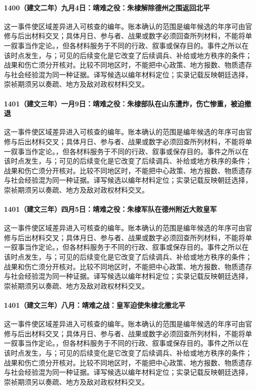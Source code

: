 \paragraph{1400（建文二年）九月4日：靖难之役：朱棣解除德州之围返回北平} 这一事件使区域差异进入可核查的编年。账本确认的范围是编年候选的年序可由官修与后出材料交叉；具体月日、参与者、战果或数字必须回查所列材料，不能将单一叙事当作定论。，但各材料服务于不同的行政、叙事或保存目的。事件之所以在该时点发生，与；可见的后续变化是它改变了后续调兵、补给或地方秩序的条件；战果和伤亡须分开核对。比较不同地区时，不能把中心政策、地方报数、物质遗存与社会经验混为同一种证据。译写候选以编年材料定位；实录记载反映朝廷选择，崇祯期须另以奏疏、地方及敌对政权材料交叉。

\paragraph{1401（建文三年）一月9日：靖难之役：朱棣部队在山东遭炸，伤亡惨重，被迫撤退} 这一事件使区域差异进入可核查的编年。账本确认的范围是编年候选的年序可由官修与后出材料交叉；具体月日、参与者、战果或数字必须回查所列材料，不能将单一叙事当作定论。，但各材料服务于不同的行政、叙事或保存目的。事件之所以在该时点发生，与；可见的后续变化是它改变了后续调兵、补给或地方秩序的条件；战果和伤亡须分开核对。比较不同地区时，不能把中心政策、地方报数、物质遗存与社会经验混为同一种证据。译写候选以编年材料定位；实录记载反映朝廷选择，崇祯期须另以奏疏、地方及敌对政权材料交叉。

\paragraph{1401（建文三年）四月5日：靖难之役：朱棣军队在德州附近大败皇军} 这一事件使区域差异进入可核查的编年。账本确认的范围是编年候选的年序可由官修与后出材料交叉；具体月日、参与者、战果或数字必须回查所列材料，不能将单一叙事当作定论。，但各材料服务于不同的行政、叙事或保存目的。事件之所以在该时点发生，与；可见的后续变化是它改变了后续调兵、补给或地方秩序的条件；战果和伤亡须分开核对。比较不同地区时，不能把中心政策、地方报数、物质遗存与社会经验混为同一种证据。译写候选以编年材料定位；实录记载反映朝廷选择，崇祯期须另以奏疏、地方及敌对政权材料交叉。

\paragraph{1401（建文三年）八月：靖难之战：皇军迫使朱棣北撤北平} 这一事件使区域差异进入可核查的编年。账本确认的范围是编年候选的年序可由官修与后出材料交叉；具体月日、参与者、战果或数字必须回查所列材料，不能将单一叙事当作定论。，但各材料服务于不同的行政、叙事或保存目的。事件之所以在该时点发生，与；可见的后续变化是它改变了后续调兵、补给或地方秩序的条件；战果和伤亡须分开核对。比较不同地区时，不能把中心政策、地方报数、物质遗存与社会经验混为同一种证据。译写候选以编年材料定位；实录记载反映朝廷选择，崇祯期须另以奏疏、地方及敌对政权材料交叉。


